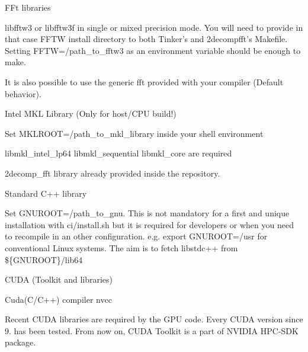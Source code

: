 \begin{DoxyItemize}
\item F\-Ft libraries
\begin{DoxyItemize}
\item {\ttfamily libfftw3} or {\ttfamily libfftw3f} in single or mixed precision mode. You will need to provide in that case F\-F\-T\-W install directory to both Tinker's and 2decompfft's Makefile. Setting {\ttfamily F\-F\-T\-W=/path\-\_\-to\-\_\-fftw3} as an environment variable should be enough to make.
\item It is also possible to use the generic fft provided with your compiler (Default behavior).
\end{DoxyItemize}
\item Intel M\-K\-L Library (Only for host/\-C\-P\-U build!)
\begin{DoxyItemize}
\item Set {\ttfamily M\-K\-L\-R\-O\-O\-T=/path\-\_\-to\-\_\-mkl\-\_\-library} inside your shell environment
\item {\ttfamily libmkl\-\_\-intel\-\_\-lp64 libmkl\-\_\-sequential libmkl\-\_\-core} are required
\end{DoxyItemize}
\item {\ttfamily 2decomp\-\_\-fft} library already provided inside the repository.
\item Standard C++ library
\begin{DoxyItemize}
\item Set {\ttfamily G\-N\-U\-R\-O\-O\-T=/path\-\_\-to\-\_\-gnu}. This is not mandatory for a first and unique installation with {\ttfamily ci/install.\-sh} but it is required for developers or when you need to recompile in an other configuration. e.\-g. {\ttfamily export G\-N\-U\-R\-O\-O\-T=/usr} for conventional Linux systems. The aim is to fetch {\ttfamily libstdc++} from {\ttfamily \$\{G\-N\-U\-R\-O\-O\-T\}/lib64}
\end{DoxyItemize}
\item {\ttfamily C\-U\-D\-A} (Toolkit and libraries)
\begin{DoxyItemize}
\item Cuda(C/\-C++) compiler {\ttfamily nvcc}
\item Recent C\-U\-D\-A libraries are required by the G\-P\-U code. Every C\-U\-D\-A version since 9. has been tested. From now on, C\-U\-D\-A Toolkit is a part of N\-V\-I\-D\-I\-A H\-P\-C-\/\-S\-D\-K package.
\end{DoxyItemize}
\end{DoxyItemize}

